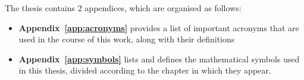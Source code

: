 The thesis contains 2 appendices, which are organised as follows:

\begin{itemize}
\item\textbf{Appendix~\ref{app:acronyms}} provides a list of important acronyms that are used in the course of this work, along with their definitions

\item\textbf{Appendix~\ref{app:symbols}} lists and defines the mathematical symbols used in this thesis, divided according to the chapter in which they appear.


\end{itemize}







